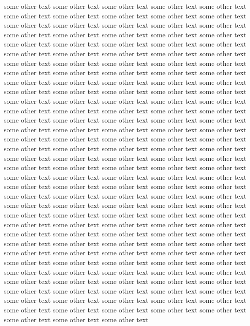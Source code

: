 \documentclass[12pt]{article}
\begin{document}


some other text some other text some other text some other text some other text some other text some other text some other text some other text some other text some other text some other text 
some other text some other text some other text some other text some other text some other text some other text some other text some other text some other text some other text some other text 
some other text some other text some other text some other text some other text some other text some other text some other text some other text some other text some other text some other text 
some other text some other text some other text some other text some other text some other text some other text some other text some other text some other text some other text some other text 
some other text some other text some other text some other text some other text some other text some other text some other text some other text some other text some other text some other text 
some other text some other text some other text some other text some other text some other text some other text some other text some other text some other text some other text some other text 
some other text some other text some other text some other text some other text some other text some other text some other text some other text some other text some other text some other text 
some other text some other text some other text some other text some other text some other text some other text some other text some other text some other text some other text some other text 
some other text some other text some other text some other text some other text some other text some other text some other text some other text some other text some other text some other text 
some other text some other text some other text some other text some other text some other text some other text some other text some other text some other text some other text some other text 
some other text some other text some other text some other text some other text some other text some other text some other text some other text some other text some other text some other text 
some other text some other text some other text some other text some other text some other text some other text some other text some other text some other text some other text some other text 
some other text some other text some other text some other text some other text some other text some other text some other text some other text some other text some other text some other text 
some other text some other text some other text some other text some other text some other text some other text some other text some other text some other text some other text some other text 
\end{document}
